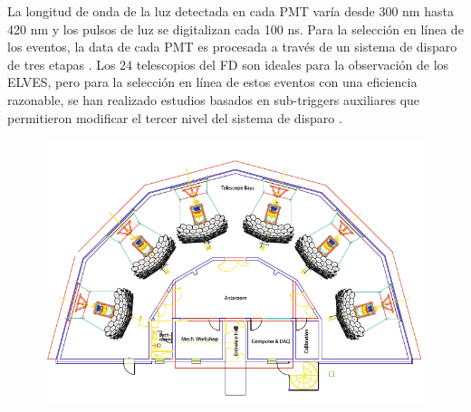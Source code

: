 \documentclass[11pt,oneside,openany,letter]{book}
\begin{document}
La longitud de onda de la luz detectada en cada PMT var\'ia desde 300 nm hasta 420 nm y los pulsos de luz se digitalizan cada 100 ns. Para la selección en línea de los eventos, la data de cada PMT es procesada a través de un sistema de disparo de tres etapas \cite{MussaCiaccio2012}. Los 24 telescopios del FD son ideales para la observación de los ELVES, pero para la selecci\'on en línea de estos eventos con una eficiencia razonable, se han realizado estudios basados en sub-triggers auxiliares que permitieron modificar el tercer nivel del sistema de disparo \cite{Mussa2019}.

\begin{figure}
    \centering
    \includegraphics[scale=0.5]{figures/eye_scheme.png}
    

\end{figure}
\end{document}
